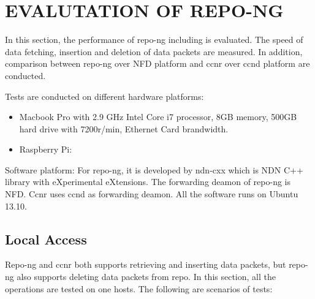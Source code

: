 \documentclass{acm_proc_article-sp}
\begin{document}
\section{EVALUTATION OF REPO-NG}

In this section, the performance of repo-ng including is evaluated. The speed of data fetching, insertion and deletion of data packets are measured. In addition, comparison between repo-ng over NFD platform and ccnr over ccnd platform are conducted.

Tests are conducted on different hardware platforms:
\begin{itemize}
\item Macbook Pro with 2.9 GHz Intel Core i7 processor, 8GB memory, 500GB hard drive with 7200r/min, Ethernet Card brandwidth.
\item Raspberry Pi:
\end{itemize}

Software platform:
For repo-ng, it is developed by ndn-cxx \cite{ndn-cxx} which is NDN C++ library with eXperimental eXtensions. The forwarding deamon of repo-ng is NFD. \cite{NFD} Ccnr uses ccnd \cite{ccnd} as forwarding deamon. All the software runs on Ubuntu 13.10.

\subsection{Local Access}

Repo-ng and ccnr both supports retrieving and inserting data packets, but repo-ng also supports deleting data packets from repo. In this section, all the operations are tested on one hosts. The following are scenarios of tests:
\end{document}
